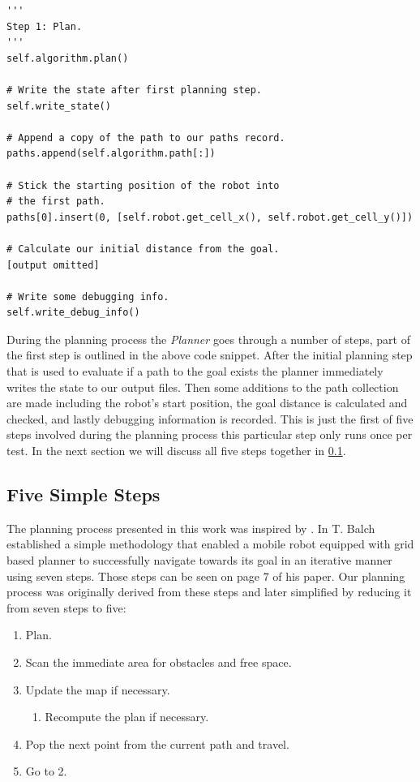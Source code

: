 \begin{lstlisting}
'''
Step 1: Plan.
'''
self.algorithm.plan()

# Write the state after first planning step.
self.write_state()

# Append a copy of the path to our paths record.
paths.append(self.algorithm.path[:])

# Stick the starting position of the robot into
# the first path.
paths[0].insert(0, [self.robot.get_cell_x(), self.robot.get_cell_y()])

# Calculate our initial distance from the goal.
[output omitted]

# Write some debugging info.
self.write_debug_info()
\end{lstlisting}

\noindent
During the planning process the \textit{Planner} goes through a number of steps, part of the first step is outlined in the above code snippet. After the initial planning step that is used to evaluate if a path to the goal exists the planner immediately writes the state to our output files. Then some additions to the path collection are made including the robot's start position, the goal distance is calculated and checked, and lastly debugging information is recorded. This is just the first of five steps involved during the planning process this particular step only runs once per test. In the next section we will discuss all five steps together in \ref{steps}.

\subsection{Five Simple Steps}\label{steps}
\noindent
The planning process presented in this work was inspired by \cite{GRIDNAV95}. In \cite{GRIDNAV95} T. Balch established a simple methodology that enabled a mobile robot equipped with grid based planner to successfully navigate towards its goal in an iterative manner using seven steps. Those steps can be seen on page 7 of his paper. Our planning process was originally derived from these steps and later simplified by reducing it from seven steps to five:

\newpage

\begin{enumerate}
\item Plan.
\item Scan the immediate area for obstacles and free space.
\item Update the map if necessary.
\begin{enumerate}
\item Recompute the plan if necessary.
\end{enumerate}
\item Pop the next point from the current path and travel.
\item Go to 2.
\end{enumerate}


